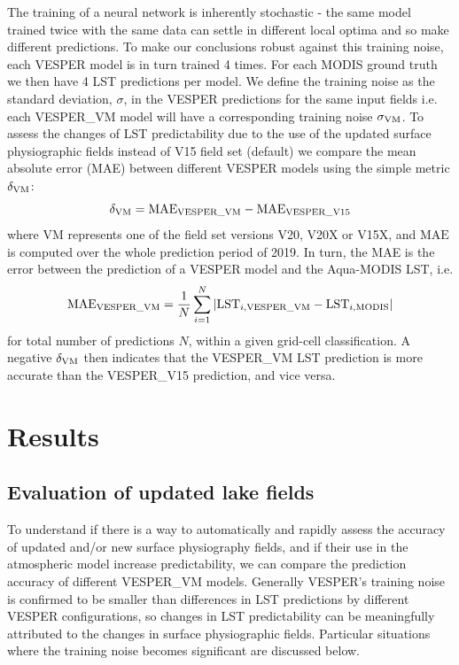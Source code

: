 \documentclass[hess, twostagejnl]{copernicus}
\begin{document}
The training of a neural network is inherently stochastic - the same model trained twice with the same data can settle in different local optima and so make different predictions. To make our conclusions robust against this training noise, each VESPER model is in turn trained 4 times. For each MODIS ground truth we then have 4 LST predictions per model. We define the training noise as the standard deviation, $\sigma$, in the VESPER predictions for the same input fields i.e. each VESPER\_VM model will have a corresponding training noise $\sigma_{\rm VM}$. To assess the changes of LST predictability due to the use of the updated surface physiographic fields instead of V15 field set (default) we compare the mean absolute error (MAE) between different VESPER models using the simple metric $\delta_{\rm VM}$:
\begin{equation} 
	\delta_{\rm VM} = \text{MAE}_{\rm VESPER\_VM} - \text{MAE}_{\rm VESPER\_V15} 
\end{equation}
where VM represents one of the field set versions V20, V20X or V15X, and $\text{MAE}$ is computed over the whole prediction period of 2019. In turn, the MAE is the error between the prediction of a VESPER model and the Aqua-MODIS LST, i.e.
\begin{equation} 
	\text{MAE}_{\rm VESPER\_VM}  = \frac{1}{N} \sum_{i=1}^{N}| \text{LST}_{i, \rm VESPER\_VM} -\text{LST}_{i, \rm MODIS} |
\end{equation}
for total number of predictions $N$, within a given grid-cell classification. A negative $\delta_{\rm VM}$ then indicates that the VESPER\_VM LST prediction is more accurate than the  VESPER\_V15 prediction, and vice versa.
\section{Results}\label{sec:3}

\subsection{Evaluation of updated lake fields}
To understand if there is a way to automatically and rapidly assess the accuracy of updated and/or new surface physiography fields, and if their use in the atmospheric model increase predictability, we can compare the prediction accuracy of different VESPER\_VM models. Generally VESPER’s training noise is confirmed to be smaller than differences in LST predictions by different VESPER configurations, so changes in LST predictability can be meaningfully attributed to the changes in surface physiographic fields. Particular situations where the training noise becomes significant are discussed below. \newline 
\end{document}
